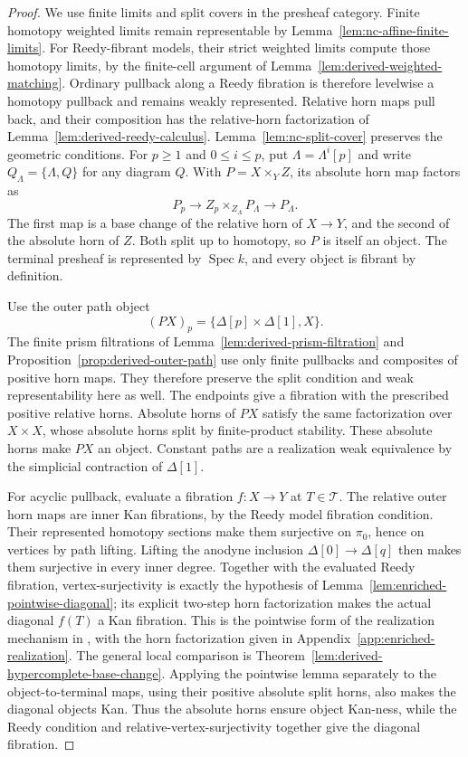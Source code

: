 \documentclass[12pt]{amsart}
\theoremstyle{definition}
\theoremstyle{remark}
\numberwithin{equation}{section}
\DeclareMathOperator{\Spec}{Spec}
\begin{document}
\begin{proof}
We use finite limits and split covers in the presheaf category.
Finite homotopy weighted limits remain
representable by Lemma~\ref{lem:nc-affine-finite-limits}. For
Reedy-fibrant models, their strict weighted limits compute those
homotopy limits, by the finite-cell argument of
Lemma~\ref{lem:derived-weighted-matching}. Ordinary pullback
along a Reedy fibration is therefore levelwise a homotopy
pullback and remains weakly represented. Relative horn maps pull
back, and their composition has the relative-horn factorization
of Lemma~\ref{lem:derived-reedy-calculus}.
Lemma~\ref{lem:nc-split-cover} preserves the geometric
conditions. For $p\ge1$ and $0\le i\le p$, put
$\Lambda=\Lambda^i[p]$ and write $Q_\Lambda=\{\Lambda,Q\}$
for any diagram $Q$. With $P=X\times_Y Z$, its absolute
horn map factors as
\[
 P_p\longrightarrow
      Z_p\times_{Z_\Lambda}P_\Lambda
          \longrightarrow P_\Lambda.
\]
The first map is a base change of the relative horn of $X\to Y$,
and the second of the absolute horn of $Z$. Both split up to
homotopy, so $P$ is itself an object. The terminal presheaf is
represented by $\Spec k$, and every object is fibrant by
definition.

Use the outer path object
\[
 (PX)_p=\{\Delta[p]\times\Delta[1],X\}.
\]
The finite prism filtrations of
Lemma~\ref{lem:derived-prism-filtration} and
Proposition~\ref{prop:derived-outer-path} use only finite
pullbacks and composites of positive horn maps. They therefore
preserve the split condition and weak representability here as
well. The endpoints give a fibration with the prescribed positive
relative horns. Absolute horns of $PX$ satisfy the same factorization
over $X\times X$, whose absolute horns split by finite-product
stability. These absolute horns make $PX$ an object.
Constant paths are a realization weak equivalence by the
simplicial contraction of $\Delta[1]$.

For acyclic pullback, evaluate a fibration $f:X\to Y$ at
$T\in\mathcal T$. The relative outer horn maps are inner Kan
fibrations, by the Reedy model fibration condition. Their
represented homotopy sections make them surjective on $\pi_0$,
hence on vertices by path lifting. Lifting the anodyne inclusion
$\Delta[0]\to\Delta[q]$ then makes them surjective in every inner
degree. Together with the evaluated Reedy fibration,
vertex-surjectivity is exactly the hypothesis of
Lemma~\ref{lem:enriched-pointwise-diagonal}; its explicit
two-step horn factorization makes the actual diagonal
$f(T)$ a Kan fibration. This is the pointwise form of
the realization mechanism in
\cite[Proposition~1.19]{Pridham2013}, with the horn
factorization given in Appendix~\ref{app:enriched-realization}.
The general local comparison is
Theorem~\ref{lem:derived-hypercomplete-base-change}.
Applying the pointwise lemma separately to the
object-to-terminal maps, using their positive
absolute split horns, also makes the diagonal objects
Kan. Thus the absolute horns ensure object Kan-ness,
while the Reedy condition and relative-vertex-surjectivity
together give the diagonal fibration.


\end{proof}
\end{document}
